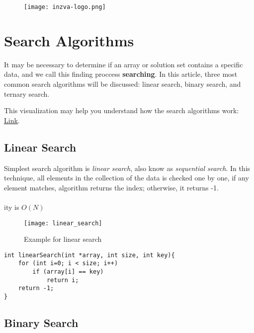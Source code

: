 \documentclass[12pt]{article}
\title{\vspace{-2em}\mytitle\vspace{-0.3em}}
\author{
	\textbf{Editor}\\
	Kadir Emre Oto  \\ \ \\ 
	\textbf{Reviewers} \\ 
	Muhammed Burak Buğrul  \\
	Tahsin Enes Kuru
}
\date{}
\begin{document}
	
	\begin{figure}
		\centering
		\texttt{[image: inzva-logo.png]}
		\label{fig:inzva}
	\end{figure}
	\maketitle
	
	\cleardoublepage
	\tableofcontents
	\cleardoublepage
	
	\section{Search Algorithms}
	
It may be necessary to determine if an array or solution set contains a specific data, and we call this finding proccess \textbf{searching}. In this article, three most common search algorithms will be discussed: linear search, binary search, and ternary search.

This visualization may help you understand how the search algorithms work: \href{https://www.cs.usfca.edu/~galles/visualization/Search.html}{Link}. 

		\subsection{Linear Search}
			
Simplest search algorithm is \textit{linear search}, also know as \textit{sequential search}. In this technique, all elements in the collection of the data is checked one by one, if any element matches, algorithm returns the index; otherwise, it returns -1. \\ \\
ity is $O(N)$

\begin{figure}[h]
	\centering
	\texttt{[image: linear\_search]}
	\caption{Example for linear search}
	\label{fig:linear_search}
\end{figure}


\begin{verbatim}
int linearSearch(int *array, int size, int key){
    for (int i=0; i < size; i++)
        if (array[i] == key)
            return i;
    return -1;
}
\end{verbatim}

\cleardoublepage
	
		\subsection{Binary Search}
			
\end{document}
